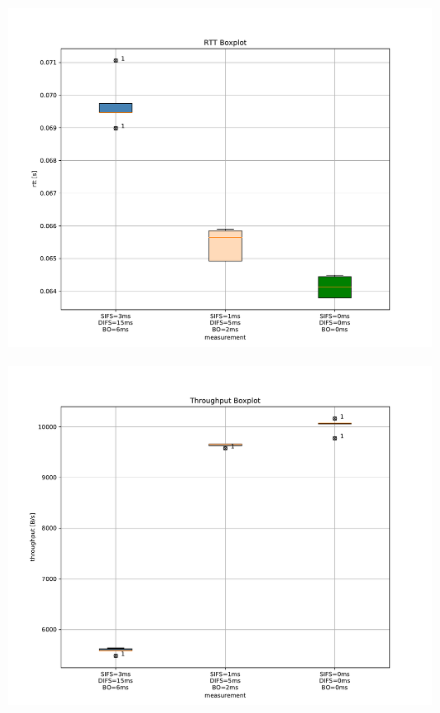 \documentclass{article}
\begin{document}
\begin{figure}
	\includegraphics[width=\textwidth]{boxplot/rtt_boxplot}
\end{figure}

\begin{figure}
	\includegraphics[width=\textwidth]{boxplot/throughput_boxplot}
\end{figure}
\end{document}
